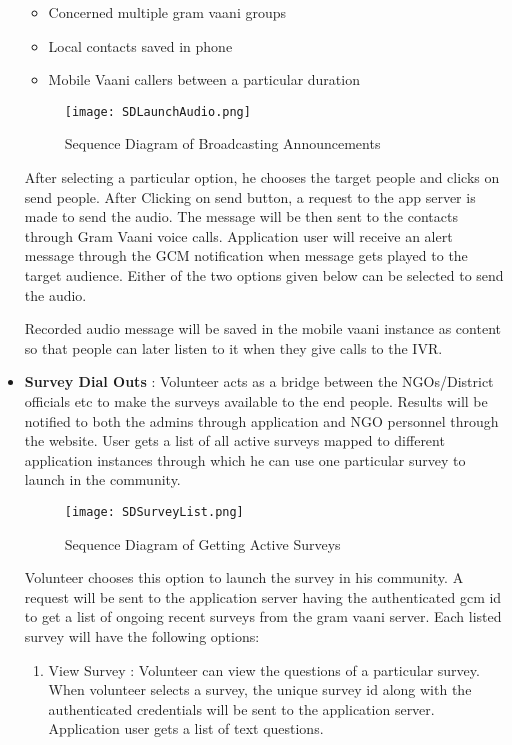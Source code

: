 \begin{itemize}
\begin{itemize}
	\item Concerned multiple gram vaani groups 
	\item Local contacts saved in phone 
	\item Mobile Vaani callers between a  particular duration
\end{itemize}

\begin{figure}[H]
    \centering
	\texttt{[image: SDLaunchAudio.png]}
    \caption{ Sequence Diagram of Broadcasting Announcements }
    \label{fig:Sequence Diagram of Broadcasting Announcements}
\end{figure}


After selecting a particular option, he chooses the target people and clicks on send people. After Clicking on send button, a request to the app server is made to send the audio. The message will be then sent to the contacts through Gram Vaani voice calls. Application user will receive an alert  message through the GCM notification when message gets played to the target audience. Either of the two options given below can be selected to send the audio.

Recorded audio message will be saved in the mobile vaani instance as content so that people can later listen to it when they give calls to the IVR.

\item \textbf{Survey Dial Outs} \label{launchsur} : Volunteer acts as a bridge between the NGOs/District officials etc to make the surveys available to the end people. Results will be notified to both the admins through application and NGO personnel through the website. User gets a list of all active surveys mapped to different application instances through which he can use one particular survey to launch in the community.

\begin{figure}[H]
    \centering
	\texttt{[image: SDSurveyList.png]}
    \caption{ Sequence Diagram of Getting Active Surveys}
    \label{fig:Sequence Diagram of Getting Active Surveys}
\end{figure}


Volunteer  chooses this option to launch the survey in his community. A request will be sent to the application server having the authenticated gcm id to get a list of ongoing recent surveys from the gram vaani server. Each listed survey will have the following options:
	\begin{enumerate}
	\item{ View Survey} : Volunteer can view the questions of a particular survey. When volunteer selects a survey, the unique survey id along with the authenticated credentials will be sent to the application server.  Application user gets a list of text questions.
	

\end{enumerate}
\end{itemize}
